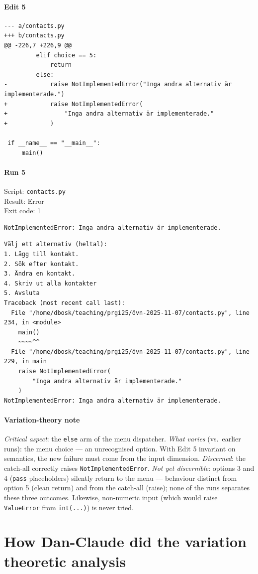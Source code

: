 \documentclass{article}
\begin{document}
\noindent
\begin{minipage}[t]{0.48\linewidth}
\paragraph{Edit 5}
\begin{verbatim}
--- a/contacts.py
+++ b/contacts.py
@@ -226,7 +226,9 @@
         elif choice == 5:
             return
         else:
-            raise NotImplementedError("Inga andra alternativ är implementerade.")
+            raise NotImplementedError(
+                "Inga andra alternativ är implementerade."
+            )
 
 if __name__ == "__main__":
     main()
\end{verbatim}
\end{minipage}
\hfill
\begin{minipage}[t]{0.48\linewidth}
\paragraph{Run 5}
Script: \texttt{contacts.py} \\
Result: Error \\
Exit code: 1

\begin{verbatim}
NotImplementedError: Inga andra alternativ är implementerade.
\end{verbatim}

\begin{verbatim}
Välj ett alternativ (heltal):
1. Lägg till kontakt.
2. Sök efter kontakt.
3. Ändra en kontakt.
4. Skriv ut alla kontakter
5. Avsluta
Traceback (most recent call last):
  File "/home/dbosk/teaching/prgi25/övn-2025-11-07/contacts.py", line 234, in <module>
    main()
    ~~~~^^
  File "/home/dbosk/teaching/prgi25/övn-2025-11-07/contacts.py", line 229, in main
    raise NotImplementedError(
        "Inga andra alternativ är implementerade."
    )
NotImplementedError: Inga andra alternativ är implementerade.
\end{verbatim}
\end{minipage}

\paragraph*{Variation-theory note}
\textit{Critical aspect}: the \verb|else| arm of the menu dispatcher.
\textit{What varies} (vs.\ earlier runs): the menu choice --- an
unrecognised option. With Edit 5 invariant on semantics, the new
failure must come from the input dimension.
\textit{Discerned}: the catch-all correctly raises
\verb|NotImplementedError|.
\textit{Not yet discernible}: options 3 and 4 (\verb|pass| placeholders)
silently return to the menu --- behaviour distinct from option 5
(clean return) and from the catch-all (raise); none of the runs
separates these three outcomes. Likewise, non-numeric input (which
would raise \verb|ValueError| from \verb|int(...)|) is never tried.

\vspace{1em}


\section{How Dan-Claude did the variation theoretic analysis}

\inputminted{text}{opus-session.txt}
\end{document}
